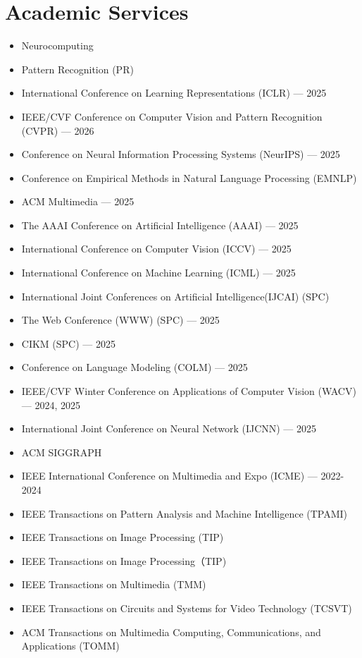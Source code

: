 \section*{Academic Services}
\begin{itemize}
\item Neurocomputing
\item Pattern Recognition (PR)
\item International Conference on Learning Representations (ICLR)  — 2025
\item IEEE/CVF Conference on Computer Vision and Pattern Recognition (CVPR)  — 2026
\item Conference on Neural Information Processing Systems (NeurIPS) — 2025
\item Conference on Empirical Methods in Natural Language Processing (EMNLP) 
\item ACM Multimedia  — 2025
\item The AAAI Conference on Artificial Intelligence (AAAI)  — 2025
\item International Conference on Computer Vision (ICCV)  — 2025
\item International Conference on Machine Learning (ICML)  — 2025
\item International Joint Conferences on Artificial Intelligence(IJCAI)   (SPC)
\item The Web Conference (WWW)  (SPC) — 2025
\item CIKM (SPC) — 2025
\item Conference on Language Modeling (COLM) — 2025
\item IEEE/CVF Winter Conference on Applications of Computer Vision (WACV)  — 2024, 2025
\item International Joint Conference on Neural Network (IJCNN)  — 2025
\item ACM SIGGRAPH
\item IEEE International Conference on Multimedia and Expo (ICME) — 2022-2024
\item IEEE Transactions on Pattern Analysis and Machine Intelligence (TPAMI)
\item IEEE Transactions on Image Processing (TIP)
\item IEEE Transactions on Image Processing（TIP)
\item IEEE Transactions on Multimedia (TMM)
\item IEEE Transactions on Circuits and Systems for Video Technology (TCSVT)
\item ACM Transactions on Multimedia Computing, Communications, and Applications (TOMM)
\end{itemize}
